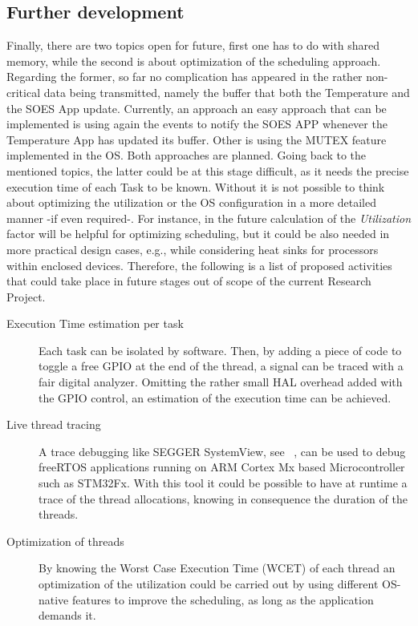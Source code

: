 \subsection{Further development}
Finally, there are two topics open for future, first one has to do with shared memory, while the second is about optimization of the
scheduling approach. Regarding the former, so far no complication has appeared in the rather non-critical data being transmitted, namely
the buffer that both the Temperature and the SOES App update. Currently, an approach an easy approach that can be implemented is using
again the events to notify the SOES APP whenever the Temperature App has updated its buffer. Other is using the MUTEX feature implemented
in the OS. Both approaches are planned. Going back to the mentioned topics, the latter could be at this stage difficult, as it needs
the precise execution time of each Task to be known. Without it is not possible 
to think about optimizing the utilization or the OS configuration in a more detailed manner -if even required-. 
For instance, in the future calculation 
of the \emph{Utilization} factor will be helpful for optimizing scheduling, but it could be also needed in more practical design cases, 
e.g., 
while considering heat sinks for processors within enclosed devices. Therefore, the following is a list of proposed 
activities that could take place in future stages out of scope of the current Research Project. 

\begin{description}
\item[Execution Time estimation per task] Each task can be isolated by software. Then, by adding a piece of code to toggle a free GPIO 
      at the end of the thread, a signal can be traced with a fair digital analyzer. Omitting the rather small HAL 
      overhead added with the GPIO control, an estimation of the execution time can be achieved.
\item[Live thread tracing]  A trace debugging like SEGGER SystemView, see ~\cite{rtos_segger},%
    can be used to debug freeRTOS applications running on ARM Cortex Mx based Microcontroller such as STM32Fx. 
    With this tool it could be possible to have at runtime a trace of the thread allocations, knowing in consequence the duration 
    of the threads. 
\item[Optimization of threads] By knowing the Worst Case Execution Time (WCET) of each thread an optimization of the utilization could be carried out 
    by using different OS-native features to improve the scheduling, as long as the application demands it.
\end{description}

